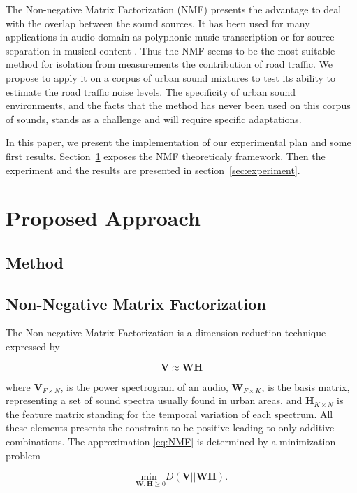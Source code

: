 \documentclass{article}
\begin{document}
\begin{sloppy}
The Non-negative Matrix Factorization (NMF) \cite{lee1999} presents the advantage to deal with the overlap between the sound sources. It has been used for many applications in audio domain as polyphonic music transcription \cite{smaragdis2003} or for source separation in musical content \cite{Virtanen2005}. Thus the NMF seems to be the most suitable method for isolation from measurements the contribution of road traffic. We propose to apply it on a corpus of urban sound mixtures to test its ability to estimate the road traffic noise levels. The specificity of urban sound environments, and the facts that the method has never been used on this corpus of sounds, stands as a challenge and will require specific adaptations.

In this paper, we present the implementation of our experimental plan and some first results. Section~\ref{sec:method} exposes the NMF theoreticaly framework. Then the experiment and the results are presented in section~\ref{sec:experiment}.


\section{Proposed Approach}\label{sec:method}

\subsection{Method}

\subsection{Non-Negative Matrix Factorization}
The Non-negative Matrix Factorization \cite{lee1999} is a dimension-reduction technique expressed by

\begin{equation}\label{eq:NMF}
\mathbf{V} \approx \mathbf{WH}
\end{equation}

where $\mathbf{V}_{F \times N}$, is the power spectrogram of an audio, $\mathbf{W}_{F \times K}$, is the basis matrix, representing a set of sound spectra usually found in urban areas, and $\mathbf{H}_{K \times N}$ is the feature matrix standing for the temporal variation of each spectrum. All these elements presents the constraint to be positive leading to only additive combinations. The approximation \ref{eq:NMF} is determined by a minimization problem

\begin{equation}\label{eq:minCost}
\underset{\mathbf{W},\mathbf{H} \geq 0}{\text{min }} D(\mathbf{V}\vert\vert \mathbf{WH}).
\end{equation}


\end{sloppy}
\end{document}
